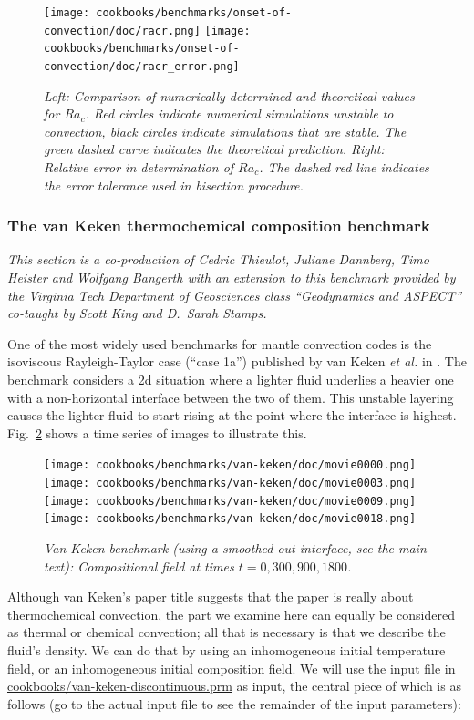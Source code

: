 \documentclass{article}
\begin{document}
\begin{figure}
 \texttt{[image: cookbooks/benchmarks/onset-of-convection/doc/racr.png]}
 \hfill
 \texttt{[image: cookbooks/benchmarks/onset-of-convection/doc/racr\_error.png]}
 \caption{\it Left: Comparison of numerically-determined and theoretical values for $Ra_c$. Red circles indicate numerical simulations unstable to convection, black circles indicate simulations that are stable. The green dashed curve indicates the theoretical prediction. Right: Relative error in determination of $Ra_c$. The dashed red line indicates the error tolerance used in bisection procedure.}
 \label{fig:onset-1}
\end{figure}

\subsubsection{The van Keken thermochemical composition benchmark}
\label{sec:benchmark-van-keken}

\textit{This section is a co-production of Cedric Thieulot, Juliane Dannberg,
Timo Heister and Wolfgang Bangerth with an extension to this benchmark provided by the Virginia Tech Department of Geosciences class ``Geodynamics and ASPECT'' co-taught by Scott King and D.~Sarah Stamps.}

One of the most widely used benchmarks for mantle convection codes is the
isoviscous Rayleigh-Taylor case (``case 1a'') published by van Keken \textit{et
al.} in \cite{KKSCND97}.
The benchmark considers a 2d situation where a lighter fluid underlies a heavier
one with a non-horizontal interface between the two of them. This unstable
layering causes the lighter fluid to start rising at the point where the
interface is highest. Fig.~\ref{fig:vk-1} shows a time series of images to
illustrate this.

\begin{figure}
  \texttt{[image: cookbooks/benchmarks/van-keken/doc/movie0000.png]}
  \hfill
  \texttt{[image: cookbooks/benchmarks/van-keken/doc/movie0003.png]}
  \hfill
  \texttt{[image: cookbooks/benchmarks/van-keken/doc/movie0009.png]}
  \hfill
  \texttt{[image: cookbooks/benchmarks/van-keken/doc/movie0018.png]}
  \caption{\it Van Keken benchmark (using a smoothed out interface, see the main
  text):
  Compositional field at times $t=0, 300, 900, 1800$.}
  \label{fig:vk-1}
\end{figure}


Although van Keken's paper title suggests that the paper is really about
thermochemical convection, the part we examine here can equally be considered as
thermal or chemical convection; all that is necessary is that we describe the
fluid's density. We can do that by using an inhomogeneous initial
temperature field, or an inhomogeneous initial composition field. We will use the
input file in \url{cookbooks/van-keken-discontinuous.prm} as input, the central
piece of which is as follows (go to the actual input file
to see the remainder of the input parameters):
\end{document}

